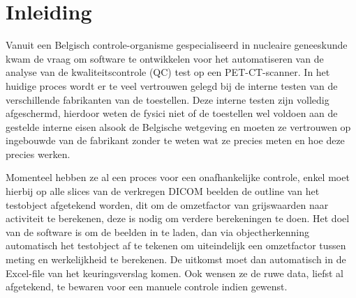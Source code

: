 \documentclass{hogent-article}
\begin{document}



\section{Inleiding}%
\label{sec:inleiding}


Vanuit een Belgisch controle-organisme gespecialiseerd in nucleaire geneeskunde kwam de vraag om software te ontwikkelen voor het automatiseren van de analyse van de kwaliteitscontrole (QC) test op een PET-CT-scanner. In het huidige proces wordt er te veel vertrouwen gelegd bij de interne testen van de verschillende fabrikanten van de toestellen. Deze interne testen zijn volledig afgeschermd, hierdoor weten de fysici niet of de toestellen wel voldoen aan de gestelde interne eisen alsook de Belgische wetgeving en moeten ze vertrouwen op ingebouwde van de fabrikant zonder te weten wat ze precies meten en hoe deze precies werken.



Momenteel hebben ze al een proces voor een onafhankelijke controle, enkel moet hierbij op alle slices van de verkregen DICOM beelden de outline van het testobject afgetekend worden, dit om de omzetfactor van grijswaarden naar activiteit te berekenen, deze is nodig om verdere berekeningen te doen. Het doel van de software is om de beelden in te laden, dan via objectherkenning automatisch het testobject af te tekenen om uiteindelijk een omzetfactor tussen meting en werkelijkheid te berekenen. De uitkomst moet dan automatisch in de Excel-file van het keuringsverslag komen. Ook wensen ze de ruwe data, liefst al afgetekend, te bewaren voor een manuele controle indien gewenst.
\end{document}
